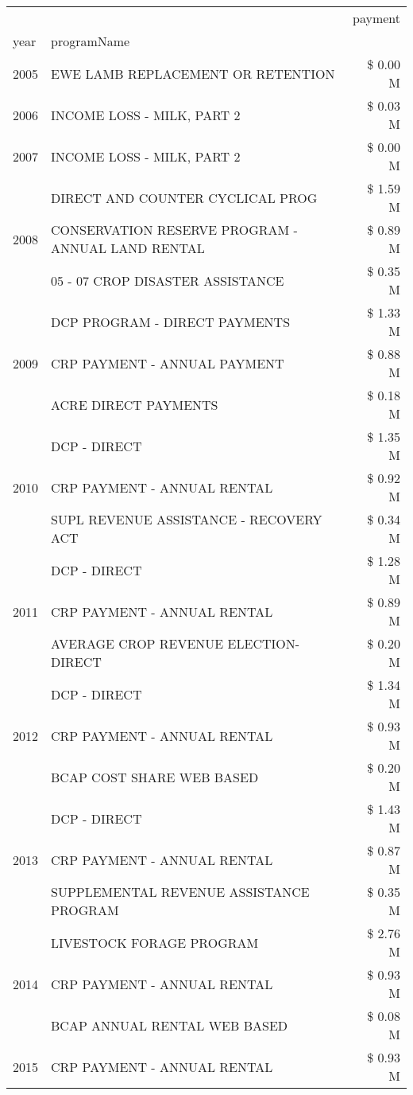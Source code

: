\begin{tabular}{llr}
\toprule
 &  & payment \\
year & programName &  \\
\midrule
2005 & EWE LAMB REPLACEMENT OR RETENTION & \$ 0.00 M \\
\cline{1-3}
2006 & INCOME LOSS - MILK, PART 2 & \$ 0.03 M \\
\cline{1-3}
2007 & INCOME LOSS - MILK, PART 2 & \$ 0.00 M \\
\cline{1-3}
\multirow[t]{3}{*}{2008} & DIRECT AND COUNTER CYCLICAL PROG & \$ 1.59 M \\
 & CONSERVATION RESERVE PROGRAM - ANNUAL LAND RENTAL & \$ 0.89 M \\
 & 05 - 07 CROP DISASTER ASSISTANCE & \$ 0.35 M \\
\cline{1-3}
\multirow[t]{3}{*}{2009} & DCP PROGRAM - DIRECT PAYMENTS & \$ 1.33 M \\
 & CRP PAYMENT - ANNUAL PAYMENT & \$ 0.88 M \\
 & ACRE DIRECT PAYMENTS & \$ 0.18 M \\
\cline{1-3}
\multirow[t]{3}{*}{2010} & DCP - DIRECT & \$ 1.35 M \\
 & CRP PAYMENT - ANNUAL RENTAL & \$ 0.92 M \\
 & SUPL REVENUE ASSISTANCE - RECOVERY ACT & \$ 0.34 M \\
\cline{1-3}
\multirow[t]{3}{*}{2011} & DCP - DIRECT & \$ 1.28 M \\
 & CRP PAYMENT - ANNUAL RENTAL & \$ 0.89 M \\
 & AVERAGE CROP REVENUE ELECTION-DIRECT & \$ 0.20 M \\
\cline{1-3}
\multirow[t]{3}{*}{2012} & DCP - DIRECT & \$ 1.34 M \\
 & CRP PAYMENT - ANNUAL RENTAL & \$ 0.93 M \\
 & BCAP COST SHARE WEB BASED & \$ 0.20 M \\
\cline{1-3}
\multirow[t]{3}{*}{2013} & DCP - DIRECT & \$ 1.43 M \\
 & CRP PAYMENT - ANNUAL RENTAL & \$ 0.87 M \\
 & SUPPLEMENTAL REVENUE ASSISTANCE PROGRAM & \$ 0.35 M \\
\cline{1-3}
\multirow[t]{3}{*}{2014} & LIVESTOCK FORAGE PROGRAM & \$ 2.76 M \\
 & CRP PAYMENT - ANNUAL RENTAL & \$ 0.93 M \\
 & BCAP ANNUAL RENTAL WEB BASED & \$ 0.08 M \\
\cline{1-3}
\multirow[t]{3}{*}{2015} & CRP PAYMENT - ANNUAL RENTAL & \$ 0.93 M \\

\end{tabular}
